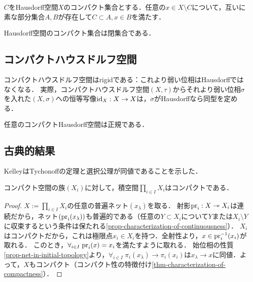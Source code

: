 \documentclass[uplatex,dvipdfmx]{jsreport}
\begin{document}
\begin{lemma}[コンパクト集合の分離]
    $C$をHausdorff空間$X$のコンパクト集合とする．任意の$x\in X\setminus C$について，互いに素な部分集合$A,B$が存在して$C\subset A,x\in B$を満たす．
\end{lemma}

\begin{proposition}
    Hausdorff空間のコンパクト集合は閉集合である．
\end{proposition}

\subsection{コンパクトハウスドルフ空間}

\begin{tcolorbox}[colframe=ForestGreen, colback=ForestGreen!10!white,breakable,colbacktitle=ForestGreen!40!white,coltitle=black,fonttitle=\bfseries\sffamily,
title=]
    コンパクトハウスドルフ空間はrigidである：これより弱い位相はHausdorffではなくなる．
    実際，コンパクトハウスドルフ空間$(X,\tau)$からそれより弱い位相$\sigma$を入れた$(X,\sigma)$への恒等写像$\mathrm{id}_X:X\to X$は，$\sigma$がHausdorffなら同型を定める．
\end{tcolorbox}

\begin{proposition}
    任意のコンパクトHausdorff空間は正規である．
\end{proposition}

\subsection{古典的結果}

\begin{tcolorbox}[colframe=ForestGreen, colback=ForestGreen!10!white,breakable,colbacktitle=ForestGreen!40!white,coltitle=black,fonttitle=\bfseries\sffamily,
title=]
    KelleyはTychonoffの定理と選択公理が同値であることを示した．
\end{tcolorbox}

\begin{theorem}[Tychonoff]
    コンパクト空間の族$(X_i)$に対して，積空間$\prod_{i\in I}X_i$はコンパクトである．
\end{theorem}
\begin{proof}
    $X:=\prod_{i\in I}X_i$の任意の普遍ネット$(x_\lambda)$を取る．
    射影$\mathrm{pr}_i:X\twoheadrightarrow X_i$は連続だから，ネット$(\mathrm{pr}_i(x_\lambda))$も普遍的である（任意の$Y\subset X_i$について$Y$または$X_i\setminus Y$に収束するという条件は保たれる\ref{prop-characterization-of-continuousness}）．
    $X_i$はコンパクトだから，これは極限点$x_i\in X_i$を持つ．全射性より，$x\in\mathrm{pr}_i^{-1}(x_i)$が取れる．
    このとき，$\forall_{i\in I}\;\mathrm{pr}_i(x)=x_i$を満たすように取れる．
    始位相の性質\ref{prop-net-in-initial-topology}より，$\forall_{i\in I}\;\pi_i(x_\lambda)\to\pi_i(x_i)$は$x_\lambda\to x$に同値．よって，$X$もコンパクト（コンパクト性の特徴付け\ref{thm-characterization-of-compactness}）．
\end{proof}
\end{document}
